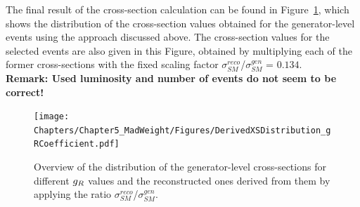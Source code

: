 The final result of the cross-section calculation can be found in Figure~\ref{fig::XSDistr}, which shows the distribution of the cross-section values obtained for the generator-level events using the approach discussed above. The cross-section values for the selected events are also given in this Figure, obtained by multiplying each of the former cross-sections with the fixed scaling factor $\sigma_{SM}^{reco}$/$\sigma_{SM}^{gen}$ = $0.134$.
\\
\textbf{Remark: Used luminosity and number of events do not seem to be correct!}
\begin{figure}[h!t]
 \centering
 \texttt{[image: Chapters/Chapter5\_MadWeight/Figures/DerivedXSDistribution\_gRCoefficient.pdf]}
 \caption{Overview of the distribution of the generator-level cross-sections for different $g_{R}$ values and the reconstructed ones derived from them by applying the ratio $\sigma_{SM}^{reco}$/$\sigma_{SM}^{gen}$.} \label{fig::XSDistr}
\end{figure}


